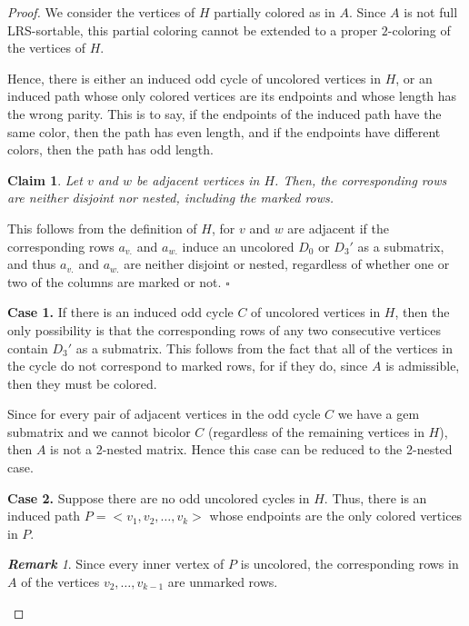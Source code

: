 \documentclass[a4paper,10pt]{report}
\theoremstyle{plain}
\newtheorem{claim}{Claim}[section]
\theoremstyle{remark}
\newtheorem{remark}{\textbf{\textit{Remark}}}[chapter]
\theoremstyle{plain}
\newcommand*{\QED}{\hfill\ensuremath{\square}}%
\begin{document}
{\begin{proof}
	
	We consider the vertices of $H$ partially colored as in $A$. Since $A$ is not full LRS-sortable, this partial coloring cannot be extended to a proper $2$-coloring of the vertices of $H$.
	
	Hence, there is either an induced odd cycle of uncolored vertices in $H$, or an induced path whose only colored vertices are its endpoints and whose length has the wrong parity. This is to say, if the endpoints of the induced path have the same color, then the path has even length, and if the endpoints have different colors, then the path has odd length.
	
	\begin{claim}
		Let $v$ and $w$ be adjacent vertices in $H$. Then, the corresponding rows are neither disjoint nor nested, including the marked rows. 
	\end{claim}	
	
	This follows from the definition of $H$, for $v$ and $w$ are adjacent if the corresponding rows $a_{v.}$ and $a_{w.}$ induce an uncolored $D_0$ or $D_3'$ as a submatrix, and thus $a_{v.}$ and $a_{w.}$ are neither disjoint or nested, regardless of whether one or two of the columns are marked or not. \QED
	
 	\textbf{Case 1.} If there is an induced odd cycle $C$ of uncolored vertices in $H$, then the only possibility is that the corresponding rows of any two consecutive vertices contain $D_3'$ as a submatrix. This follows from the fact that all of the vertices in the cycle do not correspond to marked rows, for if they do, since $A$ is admissible, then they must be colored.
 	
 	Since for every pair of adjacent vertices in the odd cycle $C$ we have a gem submatrix and we cannot bicolor $C$ (regardless of the remaining vertices in $H$), then $A$ is not a 2-nested matrix.
 	Hence this case can be reduced to the 2-nested case.
 	
 	\textbf{Case 2.} Suppose there are no odd uncolored cycles in $H$. Thus, there is an induced path $P = < v_1, v_2, \ldots, v_k >$ whose endpoints are the only colored vertices in $P$.
 	
 	\begin{remark}
 		Since every inner vertex of $P$ is uncolored, the corresponding rows in $A$ of the vertices $v_2, \ldots, v_{k-1}$ are unmarked rows.
 	\end{remark}

\end{proof}}
\end{document}
